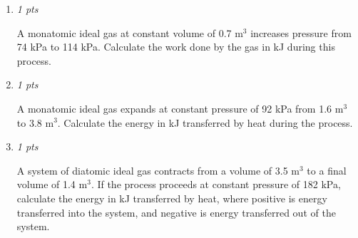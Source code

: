 \documentclass[11pt]{article}
\begin{document}
\begin{enumerate}[leftmargin=*,label=\textbf{Question \arabic*.}]
A monatomic ideal gas at constant volume of 0.5 m$^{3}$ increases pressure from 98 kPa to 166 kPa. Calculate the change in the internal energy in kJ during this process.

\item \hfill \textit{1 pts}

A monatomic ideal gas at constant volume of 0.7 m$^{3}$ increases pressure from 74 kPa to 114 kPa. Calculate the work done by the gas in kJ during this process.

\item \hfill \textit{1 pts}

A monatomic ideal gas expands at constant pressure of 92 kPa from 1.6 m$^{3}$ to 3.8 m$^{3}$. Calculate the energy in kJ transferred by heat during the process.

\item \hfill \textit{1 pts}

A system of diatomic ideal gas contracts from a volume of 3.5 m$^{3}$ to a final volume of 1.4 m$^{3}$. If the process proceeds at constant pressure of 182 kPa, calculate the energy in kJ transferred by heat, where positive is energy transferred into the system, and negative is energy transferred out of the system.

\end{enumerate}
\end{document}
